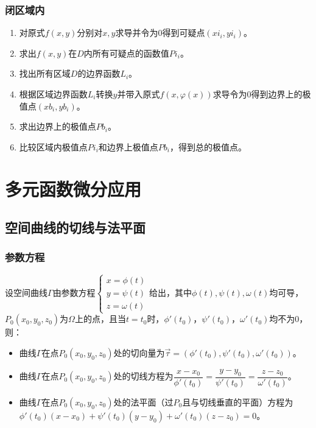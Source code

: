 \documentclass[UTF8, 12pt]{ctexart}
\begin{document}
\subsubsection{闭区域内}

\begin{enumerate}
    \item 对原式$f(x,y)$分别对$x,y$求导并令为0得到可疑点$(xi_i,yi_i)$。
    \item 求出$f(x,y)$在$D$内所有可疑点的函数值$Pi_i$。
    \item 找出所有区域$D$的边界函数$L_i$。
    \item 根据区域边界函数$L_i$转换$y$并带入原式$f(x,\varphi(x))$求导令为0得到边界上的极值点$(xb_i,yb_i)$。
    \item 求出边界上的极值点$Pb_i$。
    \item 比较区域内极值点$Pi_i$和边界上极值点$Pb_i$，得到总的极值点。
\end{enumerate}

\section{多元函数微分应用}

\subsection{空间曲线的切线与法平面}

\subsubsection{参数方程}

设空间曲线$\varGamma$由参数方程$\left\{\begin{array}{l}
    x=\phi(t) \\
    y=\psi(t) \\
    z=\omega(t)
\end{array}\right.$给出，其中$\phi(t),\psi(t),\omega(t)$均可导，$P_0(x_0,y_0,z_0)$为$\varOmega$上的点，且当$t=t_0$时，$\phi'(t_0)$，$\psi'(t_0)$，$\omega'(t_0)$均不为0，则：

\begin{itemize}
    \item 曲线$\varGamma$在点$P_0(x_0,y_0,z_0)$处的切向量为$\vec{\tau}=(\phi'(t_0),\psi'(t_0),\omega'(t_0))$。
    \item 曲线$\varGamma$在点$P_0(x_0,y_0,z_0)$处的切线方程为$\dfrac{x-x_0}{\phi'(t_0)}=\dfrac{y-y_0}{\psi'(t_0)}=\dfrac{z-z_0}{\omega'(t_0)}$。
    \item 曲线$\varGamma$在点$P_0(x_0,y_0,z_0)$处的法平面（过$P_0$且与切线垂直的平面）方程为$\phi'(t_0)(x-x_0)+\psi'(t_0)(y-y_0)+\omega'(t_0)(z-z_0)=0$。
\end{itemize}
\end{document}
